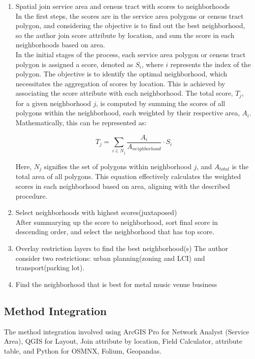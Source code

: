 \documentclass[11pt]{article}
\begin{document}
\begin{enumerate}
\item{Spatial join service area and census tract with scores to neighborhoods\\
In the first steps, the scores are in the service area polygons or census tract polygon, and considering the objective is to find out the best neighborhood, so the author join score attribute by location, and sum the score in each neighborhoods based on area.\\
In the initial stages of the process, each service area polygon or census tract polygon is assigned a score, denoted as $S_i$, where $i$ represents the index of the polygon. The objective is to identify the optimal neighborhood, which necessitates the aggregation of scores by location. This is achieved by associating the score attribute with each neighborhood. The total score, $T_j$, for a given neighborhood $j$, is computed by summing the scores of all polygons within the neighborhood, each weighted by their respective area, $A_i$. Mathematically, this can be represented as:

\begin{equation}
T_j = \sum_{i \in N_j} \frac{A_i}{A_{neighborhood}} \cdot S_i
\end{equation}

Here, $N_j$ signifies the set of polygons within neighborhood $j$, and $A_{total}$ is the total area of all polygons. This equation effectively calculates the weighted scores in each neighborhood based on area, aligning with the described procedure.
}

\item{Select neighborhoods with highest scores(juxtaposed)\\
After summarying up the score to neighborhood, sort final score in descending order, and select the neighborhood that has top score.
}

\item{Overlay restriction layers to find the best neighborhood(s)
The author consider two restrictions: urban planning(zoning and LCI) and transport(parking lot).  
}
\item {Find the neighborhood that is best for metal music venue business}
\end{enumerate}




\subsection{Method Integration}
The method integration involved using ArcGIS Pro for Network Analyst (Service Area), QGIS for Layout, Join attribute by location, Field Calculator, attribute table, and Python for OSMNX, Folium, Geopandas.
\end{document}
